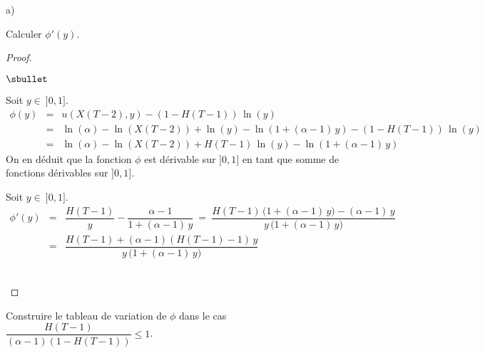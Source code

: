 \documentclass[11pt]{article}%
\begin{document}
  \begin{noliste}{a)}
    \setcounter{enumi}{6}
    \setlength{\itemsep}{2mm}
    \item Calculer $\phi'(y)$.
    
    \begin{proof}~
      \begin{noliste}{$\sbullet$}
	\item Soit $y \in \ ]0,1]$.
	\[
	  \begin{array}{rcl}
	    \phi(y) &=& u(X(T-2),y) -(1- H(T-1)) \, \ln(y)
	    \\[.2cm]
	    &=& \ln(\alpha) - \ln(X(T-2)) + \ln(y) - 
	    \ln(1+(\alpha -1) \, y) - (1- H(T-1)) \, \ln(y)
	    \\[.2cm]
	    &=& \ln(\alpha) - \ln(X(T-2)) 
	    + H(T-1) \, \ln(y) - \ln(1+(\alpha-1) \,y)
	  \end{array}
	\]
	On en déduit que la fonction $\phi$ est dérivable sur $]0,1]$
	en tant que somme de fonctions dérivables sur $]0,1]$.
	
	\item Soit $y \in \ ]0,1]$.
	\[
	  \begin{array}{rcl}
	    \phi'(y) &=& \dfrac{H(T-1)}{y} - \dfrac{\alpha -1}
	    {1+(\alpha -1) \, y}
	    \ = \ \dfrac{H(T-1) \, \big(1+ (\alpha-1) \, y \big) - 
	    (\alpha -1) \, y}{y \, \big(1+ (\alpha -1) \, y\big)}
	    \\[.6cm]
	    &=& \dfrac{H(T-1) + (\alpha-1) (H(T-1)-1) \, y}
	    {y \, \big(1+ (\alpha -1) \, y\big)}
	  \end{array}
	\]
      \end{noliste}
      \conc{$\forall y \in \ ]0,1]$, $\phi'(y) =
      \dfrac{H(T-1) + (\alpha-1) (H(T-1)-1) \, y}
	    {y \, \big(1+ (\alpha -1) \, y\big)}$}~\\[-1cm]
    \end{proof}
    
    \item Construire le tableau de variation de $\phi$ dans le cas 
    $\dfrac{H(T-1)}{(\alpha-1)(1-H(T-1))} \leq 1$.
    

\end{noliste}
\end{document}
